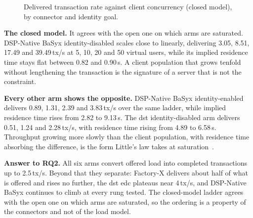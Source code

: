 \begin{figure}[ht]
    \centering
    \caption[Throughput against client concurrency]{Delivered transaction rate against client concurrency (closed model), by connector and identity goal.}
    \label{fig:rq2-concurrency}
\end{figure}

\textbf{The closed model.} It agrees with the open one on which arms are saturated. DSP-Native BaSyx identity-disabled scales close to linearly, delivering 3.05, 8.51, 17.49 and 39.49\,tx/s at 5, 10, 20 and 50 virtual users, while its implied residence time stays flat between 0.82 and 0.90\,s. A client population that grows tenfold without lengthening the transaction is the signature of a server that is not the constraint.

\textbf{Every other arm shows the opposite.} DSP-Native BaSyx identity-enabled delivers 0.89, 1.31, 2.39 and 3.83\,tx/s over the same ladder, while implied residence time rises from 2.82 to 9.13\,s. The \gls{dst} identity-disabled arm delivers 0.51, 1.24 and 2.28\,tx/s, with residence time rising from 4.89 to 6.58\,s. Throughput growing more slowly than the client population, with residence time absorbing the difference, is the form Little's law takes at saturation~\citep{little1961proof}.

\textbf{Answer to RQ2.} All six arms convert offered load into completed transactions up to 2.5\,tx/s. Beyond that they separate: Factory-X delivers about half of what is offered and rises no further, the \gls{dst} \gls{edc} plateaus near 4\,tx/s, and DSP-Native BaSyx continues to climb at every rung tested. The closed-model ladder agrees with the open one on which arms are saturated, so the ordering is a property of the connectors and not of the load model.

